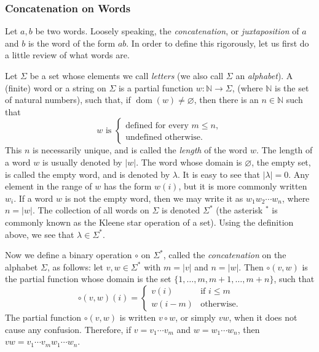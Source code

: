 \documentclass[12pt]{article}
\begin{document}

\subsubsection*{Concatenation on Words}

Let $a,b$ be two words.  Loosely speaking, the \emph{concatenation}, or \emph{juxtaposition} of $a$ and $b$ is the word of the form $ab$.  In order to define this rigorously, let us first do a little review of what words are.  

Let $\Sigma$ be a set whose elements we call \emph{letters} (we also call $\Sigma$ an \emph{alphabet}).  A (finite) word or a string on $\Sigma$ is a partial function $w:\mathbb{N} \to \Sigma$, (where $\mathbb{N}$ is the set of natural numbers), such that, if $\operatorname{dom}(w)\ne \varnothing$, then there is an $n\in \mathbb{N}$ such that 
\begin{displaymath}
w \textrm{ is } \left\{
\begin{array}{ll}
\textrm{defined for every }m\le n,\\
\textrm{undefined otherwise.}
\end{array}
\right.
\end{displaymath}
This $n$ is necessarily unique, and is called the \emph{length} of the word $w$.  The length of a word $w$ is usually denoted by $|w|$.  The word whose domain is $\varnothing$, the empty set, is called the empty word, and is denoted by $\lambda$.  It is easy to see that $|\lambda|=0$.  Any element in the range of $w$ has the form $w(i)$, but it is more commonly written $w_i$.  If a word $w$ is not the empty word, then we may write it as $w_1w_2\cdots w_n$, where $n=|w|$.  The collection of all words on $\Sigma$ is denoted $\Sigma^*$ (the asterisk $^*$ is commonly known as the Kleene star operation of a set).  Using the definition above, we see that $\lambda\in \Sigma^*$.

Now we define a binary operation $\circ$ on $\Sigma^*$, called the \emph{concatenation} on the alphabet $\Sigma$, as follows: let $v,w\in \Sigma^*$ with $m=|v|$ and $n=|w|$.  Then $\circ(v,w)$ is the partial function whose domain is the set $\lbrace 1, \ldots, m, m+1, \ldots, m+n\rbrace$, such that
\begin{displaymath}
\circ(v,w)(i) = \left\{ 
\begin{array}{ll}
v(i) & \textrm{if }i\le m\\
w(i-m) & \textrm{otherwise.}
\end{array} 
\right.
\end{displaymath}
The partial function $\circ(v,w)$ is written $v\circ w$, or simply $vw$, when it does not cause any confusion.  Therefore, if $v=v_1\cdots v_m$ and $w=w_1\cdots w_n$, then $vw=v_1\cdots v_mw_1\cdots w_n$.
\end{document}
